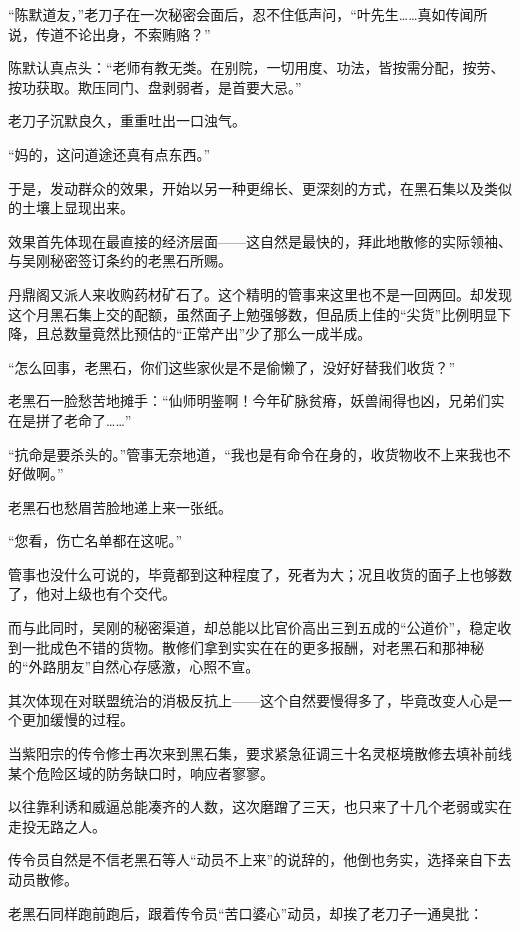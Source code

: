 “陈默道友，”老刀子在一次秘密会面后，忍不住低声问，“叶先生……真如传闻所说，传道不论出身，不索贿赂？”

陈默认真点头：“老师有教无类。在别院，一切用度、功法，皆按需分配，按劳、按功获取。欺压同门、盘剥弱者，是首要大忌。”

老刀子沉默良久，重重吐出一口浊气。

“妈的，这问道途还真有点东西。”

\vspace{2em}

于是，发动群众的效果，开始以另一种更绵长、更深刻的方式，在黑石集以及类似的土壤上显现出来。

效果首先体现在最直接的经济层面——这自然是最快的，拜此地散修的实际领袖、与吴刚秘密签订条约的老黑石所赐。

丹鼎阁又派人来收购药材矿石了。这个精明的管事来这里也不是一回两回。却发现这个月黑石集上交的配额，虽然面子上勉强够数，但品质上佳的“尖货”比例明显下降，且总数量竟然比预估的“正常产出”少了那么一成半成。

“怎么回事，老黑石，你们这些家伙是不是偷懒了，没好好替我们收货？”

老黑石一脸愁苦地摊手：“仙师明鉴啊！今年矿脉贫瘠，妖兽闹得也凶，兄弟们实在是拼了老命了……”

“抗命是要杀头的。”管事无奈地道，“我也是有命令在身的，收货物收不上来我也不好做啊。”

老黑石也愁眉苦脸地递上来一张纸。

“您看，伤亡名单都在这呢。”

管事也没什么可说的，毕竟都到这种程度了，死者为大；况且收货的面子上也够数了，他对上级也有个交代。

而与此同时，吴刚的秘密渠道，却总能以比官价高出三到五成的“公道价”，稳定收到一批成色不错的货物。散修们拿到实实在在的更多报酬，对老黑石和那神秘的“外路朋友”自然心存感激，心照不宣。

\vspace{2em}

其次体现在对联盟统治的消极反抗上——这个自然要慢得多了，毕竟改变人心是一个更加缓慢的过程。

当紫阳宗的传令修士再次来到黑石集，要求紧急征调三十名灵枢境散修去填补前线某个危险区域的防务缺口时，响应者寥寥。

以往靠利诱和威逼总能凑齐的人数，这次磨蹭了三天，也只来了十几个老弱或实在走投无路之人。

传令员自然是不信老黑石等人“动员不上来”的说辞的，他倒也务实，选择亲自下去动员散修。

老黑石同样跑前跑后，跟着传令员“苦口婆心”动员，却挨了老刀子一通臭批：

